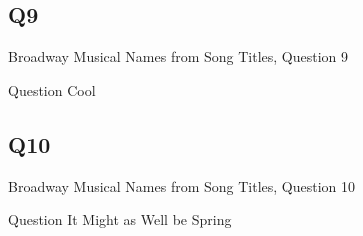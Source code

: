\documentclass[11pt]{beamer}
\begin{document}
\subsection*{Q9}
\begin{frame}[t]{Broadway Musical Names from Song Titles, Question 9}
\begin{block}{Question}
Cool
\end{block}
\end{frame}
\subsection*{Q10}
\begin{frame}[t]{Broadway Musical Names from Song Titles, Question 10}
\begin{block}{Question}
It Might as Well be Spring
\end{block}
\end{frame}
\end{document}

